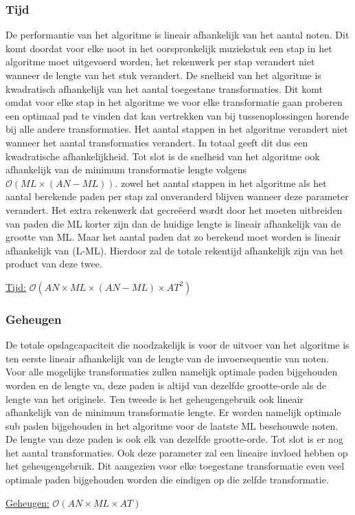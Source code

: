 \subsubsection{Tijd}
De performantie van het algoritme is lineair afhankelijk van het aantal noten. Dit komt doordat voor elke noot in het oorspronkelijk muziekstuk een stap in het algoritme moet uitgevoerd worden, het rekenwerk per stap verandert niet wanneer de lengte van het stuk verandert. De snelheid van het algoritme is kwadratisch afhankelijk van het aantal toegestane transformaties. Dit komt omdat voor elke stap in het algoritme we voor elke transformatie gaan proberen een optimaal pad te vinden dat kan vertrekken van bij tussenoplossingen horende bij alle andere transformaties. Het aantal stappen in het algoritme verandert niet wanneer het aantal transformaties verandert. In totaal geeft dit dus een kwadratische afhankelijkheid. Tot slot is de snelheid van het algoritme ook afhankelijk van de minimum transformatie lengte volgens $\mathcal{O}(ML \times (AN-ML))$. zowel het aantal stappen in het algoritme als het aantal berekende paden per stap zal onveranderd blijven wanneer deze parameter verandert. Het extra rekenwerk dat gecre\"eerd wordt door het moeten uitbreiden van paden die ML korter zijn dan de huidige lengte is lineair afhankelijk van de grootte van ML. Maar het aantal paden dat zo berekend moet worden is lineair afhankelijk van (L-ML). Hierdoor zal de totale rekentijd afhankelijk zijn van het product van deze twee.

\begin{center}
\underline{Tijd:} $\mathcal{O}(AN \times ML \times (AN-ML) \times AT^2)$
\end{center}

\subsubsection{Geheugen}
De totale opslagcapaciteit die noodzakelijk is voor de uitvoer van het algoritme is ten eerste lineair afhankelijk van de lengte van de invoersequentie van noten. Voor alle mogelijke transformaties zullen namelijk optimale paden bijgehouden worden en de lengte va, deze paden is altijd van dezelfde grootte-orde als de lengte van het originele. Ten tweede is het geheugengebruik ook lineair afhankelijk van de minimum transformatie lengte. Er worden namelijk optimale sub paden bijgehouden in het algoritme voor de laatste ML beschouwde noten. De lengte van deze paden is ook elk van dezelfde grootte-orde. Tot slot is er nog het aantal transformaties. Ook deze parameter zal een lineaire invloed hebben op het geheugengebruik. Dit aangezien voor elke toegestane transformatie even veel optimale paden bijgehouden worden die eindigen op die zelfde transformatie.  

\begin{center}
\underline{Geheugen:} $\mathcal{O}(AN \times ML \times AT)$
\end{center}

